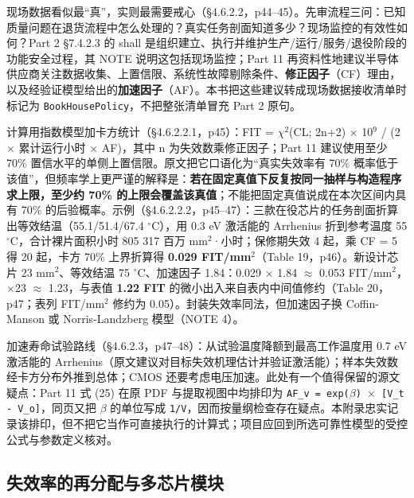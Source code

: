 现场数据看似最“真”，实则最需要戒心（§4.6.2.2，p44–45）。先审流程三问：已知质量问题在退货流程中怎么处理的？真实任务剖面知道多少？现场监控的有效性如何？Part 2 §7.4.2.3 的 shall 是组织建立、执行并维护生产/运行/服务/退役阶段的功能安全过程，其 NOTE 说明这包括现场监控；Part 11 再资料性地建议半导体供应商关注数据收集、上置信限、系统性故障剔除条件、\textbf{修正因子}（CF）理由，以及经验证模型给出的\textbf{加速因子}（AF）。本书把这些建议转成现场数据接收清单时标记为 \nolinkurl{BookHousePolicy}，不把整张清单冒充 Part 2 原句。

计算用指数模型加卡方统计（§4.6.2.2.1，p45）：FIT = \(\chi\)\(^{2}\)(CL; 2n+2) \(\times\) 10\(^{9}\) / (2 \(\times\) 累计运行小时 \(\times\) AF)，其中 n 为失效数乘修正因子；Part 11 建议使用至少 70\% 置信水平的单侧上置信限。原文把它口语化为“真实失效率有 70\% 概率低于该值”，但频率学上更严谨的解释是：\textbf{若在固定真值下反复按同一抽样与构造程序求上限，至少约 70\% 的上限会覆盖该真值}；不能把固定真值说成在本次区间内具有 70\% 的后验概率。示例（§4.6.2.2.2，p45–47）：三款在役芯片的任务剖面折算出等效结温（55.1/51.4/67.4 \(^{\circ}\)C），用 0.3 eV 激活能的 Arrhenius 折到参考温度 55 \(^{\circ}\)C，合计裸片面积小时 805 317 百万 mm\(^{2}\)·小时；保修期失效 4 起，乘 CF = 5 得 20 起，卡方 70\% 上界折算得 \textbf{0.029 FIT/mm\(^{2}\)}（Table 19，p46）。新设计芯片 23 mm\(^{2}\)、等效结温 75 \(^{\circ}\)C、加速因子 1.84：0.029 \(\times\) 1.84 \(\approx\) 0.053 FIT/mm\(^{2}\)，\(\times\)23 \(\approx\) 1.23，与表值 \textbf{1.22 FIT} 的微小出入来自表内中间值修约（Table 20，p47；表列 FIT/mm\(^{2}\) 修约为 0.05）。封装失效率同法，但加速因子换 Coffin-Manson 或 Norris-Landzberg 模型（NOTE 4）。

加速寿命试验路线（§4.6.2.3，p47–48）：从试验温度降额到最高工作温度用 0.7 eV 激活能的 Arrhenius（原文建议对目标失效机理估计并验证激活能）；样本失效数经卡方分布外推到总体；CMOS 还要考虑电压加速。此处有一个值得保留的源文疑点：Part 11 式 (25) 在原 PDF 与提取视图中均排印为 \allowbreak{}\texttt{AF\_\allowbreak{}v \allowbreak{}=\allowbreak{} \allowbreak{}exp(\(\beta\)) \allowbreak{}\(\times\) \allowbreak{}[V\_\allowbreak{}t \allowbreak{}- \allowbreak{}V\_\allowbreak{}o]}\allowbreak{}，同页又把 \(\beta\) 的单位写成 \nolinkurl{1/V}，因而按量纲检查存在疑点。本附录忠实记录该排印，但不把它当作可直接执行的计算式；项目应回到所选可靠性模型的受控公式与参数定义核对。

\subsection{失效率的再分配与多芯片模块}

